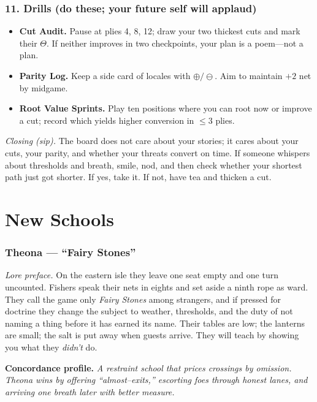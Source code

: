 \documentclass[11pt]{article}
\begin{document}
\begin{itemize}
\subsubsection{11. Drills (do these; your future self will applaud)}
\begin{itemize}\setlength\itemsep{0.25em}
  \item \textbf{Cut Audit.} Pause at plies 4, 8, 12; draw your two thickest cuts and mark their \(\Theta\). If neither improves in two checkpoints, your plan is a poem—not a plan.
  \item \textbf{Parity Log.} Keep a side card of locales with \(\oplus/\ominus\). Aim to maintain \(+\!2\) net by midgame.
  \item \textbf{Root Value Sprints.} Play ten positions where you can root now or improve a cut; record which yields higher conversion in \(\le 3\) plies.
\end{itemize}

\medskip
\noindent\textit{Closing (sip).} The board does not care about your stories; it cares about your cuts, your parity, and whether your threats convert on time. If someone whispers about thresholds and breath, smile, nod, and then check whether your shortest path just got shorter. If yes, take it. If not, have tea and thicken a cut.

\clearpage
\section{New Schools}
\label{app:schools}

\subsubsection{Theona — “Fairy Stones”}
\label{school:theona}
{}

\noindent\textit{Lore preface.} On the eastern isle they leave one seat empty and one turn uncounted. Fishers speak their nets in eights and set aside a ninth rope as ward. They call the game only \emph{Fairy Stones} among strangers, and if pressed for doctrine they change the subject to weather, thresholds, and the duty of not naming a thing before it has earned its name. Their tables are low; the lanterns are small; the salt is put away when guests arrive. They will teach by showing you what they \emph{didn’t} do.

\medskip
\noindent\textbf{Concordance profile.} \emph{A restraint school that prices crossings by omission. Theona wins by offering “almost–exits,” escorting foes through honest lanes, and arriving one breath later with better measure.}


\end{itemize}
\end{document}
